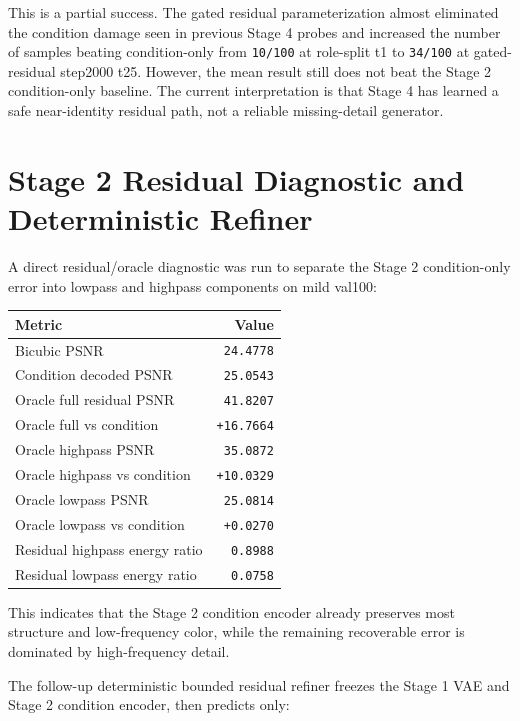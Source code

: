 \documentclass[
  10pt,
]{article}
\begin{document}
This is a partial success. The gated residual parameterization almost
eliminated the condition damage seen in previous Stage 4 probes and
increased the number of samples beating condition-only from
\texttt{10/100} at role-split t1 to \texttt{34/100} at gated-residual
step2000 t25. However, the mean result still does not beat the Stage 2
condition-only baseline. The current interpretation is that Stage 4 has
learned a safe near-identity residual path, not a reliable
missing-detail generator.

\hypertarget{stage-2-residual-diagnostic-and-deterministic-refiner}{%
\section{Stage 2 Residual Diagnostic and Deterministic
Refiner}\label{stage-2-residual-diagnostic-and-deterministic-refiner}}

A direct residual/oracle diagnostic was run to separate the Stage 2
condition-only error into lowpass and highpass components on mild
val100:

\begin{longtable}[]{@{}lr@{}}
\toprule\noalign{}
Metric & Value \\
\midrule\noalign{}
\endhead
\bottomrule\noalign{}
\endlastfoot
Bicubic PSNR & \texttt{24.4778} \\
Condition decoded PSNR & \texttt{25.0543} \\
Oracle full residual PSNR & \texttt{41.8207} \\
Oracle full vs condition & \texttt{+16.7664} \\
Oracle highpass PSNR & \texttt{35.0872} \\
Oracle highpass vs condition & \texttt{+10.0329} \\
Oracle lowpass PSNR & \texttt{25.0814} \\
Oracle lowpass vs condition & \texttt{+0.0270} \\
Residual highpass energy ratio & \texttt{0.8988} \\
Residual lowpass energy ratio & \texttt{0.0758} \\
\end{longtable}

This indicates that the Stage 2 condition encoder already preserves most
structure and low-frequency color, while the remaining recoverable error
is dominated by high-frequency detail.

The follow-up deterministic bounded residual refiner freezes the Stage 1
VAE and Stage 2 condition encoder, then predicts only:
\end{document}
